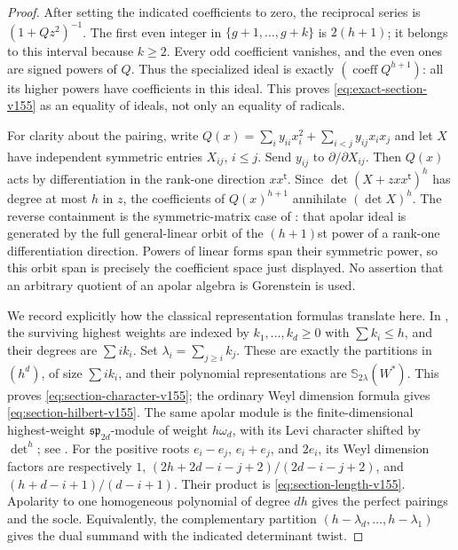 \documentclass[11pt,reqno]{amsart}
\numberwithin{equation}{section}
\theoremstyle{definition}\newtheorem{definition}[theorem]{Definition}
\theoremstyle{remark}\newtheorem{remark}[theorem]{Remark}
\begin{document}
\begin{proof}
After setting the indicated coefficients to zero, the reciprocal
series is $(1+Qz^2)^{-1}$.  The first even integer in
$\{g+1,\ldots,g+k\}$ is $2(h+1)$; it belongs to this interval
because $k\geq2$.  Every odd coefficient vanishes, and the even
ones are signed powers of $Q$.  Thus the specialized ideal is
exactly $(\operatorname{coeff}Q^{h+1})$: all its higher powers have
coefficients in this ideal.  This proves \eqref{eq:exact-section-v155}
as an equality of ideals, not only an equality of radicals.

For clarity about the pairing, write
$Q(x)=\sum_i y_{ii}x_i^2+\sum_{i<j}y_{ij}x_ix_j$ and let $X$ have
independent symmetric entries $X_{ij}$, $i\leq j$.  Send $y_{ij}$
to $\partial/\partial X_{ij}$.  Then $Q(x)$ acts by differentiation
in the rank-one direction $xx^{\mathsf t}$.  Since
$\det(X+zxx^{\mathsf t})^h$ has degree at most $h$ in $z$, the
coefficients of $Q(x)^{h+1}$ annihilate $(\det X)^h$.
The reverse containment is the symmetric-matrix case of
\cite[Remark~11, pp.~8--9]{NagaokaWachi2024}: that apolar ideal is
generated by the full general-linear orbit of the $(h+1)$st power
of a rank-one differentiation direction.  Powers of linear forms
span their symmetric power, so this orbit span is precisely the
coefficient space just displayed.  No assertion that an arbitrary
quotient of an apolar algebra is Gorenstein is used.

We record explicitly how the classical representation formulas
translate here.  In \cite[Example~9 and Proposition~10]{NagaokaWachi2024},
the surviving highest weights are indexed by
$k_1,\ldots,k_d\geq0$ with $\sum k_i\leq h$, and their degrees are
$\sum i k_i$.  Set $\lambda_i=\sum_{j\geq i}k_j$.
These are exactly the partitions in $(h^d)$, of size $\sum i k_i$,
and their polynomial representations are $\mathbb S_{2\lambda}(W^*)$.
This proves \eqref{eq:section-character-v155}; the ordinary Weyl
dimension formula gives \eqref{eq:section-hilbert-v155}.
The same apolar module is the finite-dimensional highest-weight
$\mathfrak{sp}_{2d}$-module of weight $h\omega_d$, with its Levi
character shifted by $\det^h$; see
\cite[Proposition~16 and Lemma~13]{NagaokaWachi2024}.
For the positive roots $e_i-e_j$, $e_i+e_j$, and $2e_i$, its Weyl
dimension factors are respectively $1$,
$(2h+2d-i-j+2)/(2d-i-j+2)$, and
$(h+d-i+1)/(d-i+1)$.  Their product is
\eqref{eq:section-length-v155}.
Apolarity to one homogeneous polynomial of degree $dh$ gives the
perfect pairings and the socle.  Equivalently, the complementary
partition $(h-\lambda_d,\ldots,h-\lambda_1)$ gives the dual summand
with the indicated determinant twist.


\end{proof}
\end{document}
